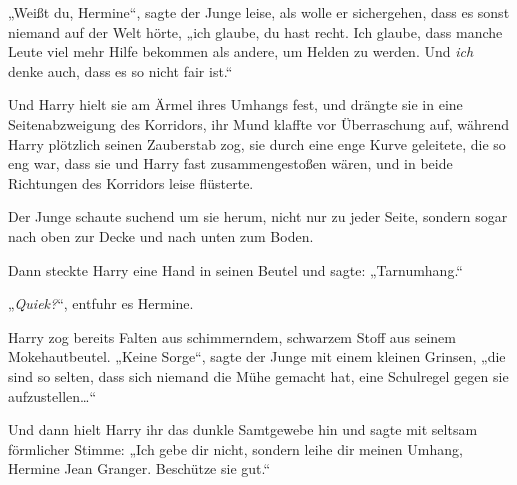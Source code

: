 „Weißt du, Hermine“, sagte der Junge leise, als wolle er sichergehen, dass es sonst niemand auf der Welt hörte, „ich glaube, du hast recht. Ich glaube, dass manche Leute viel mehr Hilfe bekommen als andere, um Helden zu werden. Und \emph{ich} denke auch, dass es so nicht fair ist.“

Und Harry hielt sie am Ärmel ihres Umhangs fest, und drängte sie in eine Seitenabzweigung des Korridors, ihr Mund klaffte vor Überraschung auf, während Harry plötzlich seinen Zauberstab zog, sie durch eine enge Kurve geleitete, die so eng war, dass sie und Harry fast zusammengestoßen wären, und in beide Richtungen des Korridors leise  flüsterte.

Der Junge schaute suchend um sie herum, nicht nur zu jeder Seite, sondern sogar nach oben zur Decke und nach unten zum Boden.

Dann steckte Harry eine Hand in seinen Beutel und sagte: „Tarnumhang.“

„\emph{Quiek?}“, entfuhr es Hermine.

Harry zog bereits Falten aus schimmerndem, schwarzem Stoff aus seinem Mokehautbeutel. „Keine Sorge“, sagte der Junge mit einem kleinen Grinsen, „die sind so selten, dass sich niemand die Mühe gemacht hat, eine Schulregel gegen sie aufzustellen…“

Und dann hielt Harry ihr das dunkle Samtgewebe hin und sagte mit seltsam förmlicher Stimme: „Ich gebe dir nicht, sondern leihe dir meinen Umhang, Hermine Jean Granger. Beschütze sie gut.“

